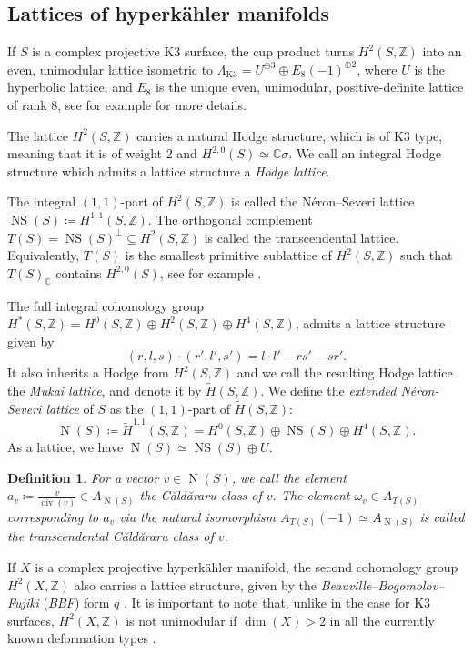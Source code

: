 \documentclass[11pt,twoside]{amsart}
\numberwithin{equation}{section}
\newtheorem{definition}[dummy]{Definition}
\theoremstyle{definition}
\theoremstyle{plain}
\newcommand{\Z}{\ensuremath{\mathbb{Z}}}
\newcommand{\CC}{\ensuremath{\mathbb{C}}}
\def\NS{\operatorname{NS}}
\def\N{\operatorname{N}}
\def\dv{\operatorname{div}}
\begin{document}
\subsection{Lattices of hyperk\"ahler manifolds}
If $S$ is a complex projective K3 surface, the cup product turns $H^2(S,\Z)$ into an even, unimodular lattice isometric to $\Lambda_{\text{K3}} = U^{\oplus 3}\oplus E_{8}(-1)^{\oplus2}$, where $U$ is the hyperbolic lattice, and $E_8$ is the unique even, unimodular, positive-definite lattice of rank 8, see for example \cite[\S VIII.1]{BPV12} for more details.

The lattice $H^2(S,\Z)$ carries a natural Hodge structure, which is of K3 type, meaning that it is of weight 2 and $H^{2,0}(S) \simeq \CC\sigma$. We call an integral Hodge structure which admits a lattice structure a \textit{Hodge lattice}.

The integral $(1,1)$-part of $H^2(S,\Z)$ is called the N\'eron--Severi lattice $\NS(S)\coloneqq H^{1,1}(S,\Z)$.
The orthogonal complement $T(S) = \operatorname{NS}(S)^\perp \subseteq H^2(S,\Z)$ is called the transcendental lattice. Equivalently, $T(S)$ is the smallest primitive sublattice of $H^2(S,\Z)$ such that $T(S)_\CC$ contains $H^{2,0}(S)$, see for example \cite[\S3.2.2]{Huy16}.

The full integral cohomology group $H^*(S,\Z) = H^0(S,\Z)\oplus H^2(S,\Z)\oplus H^4(S,\Z)$, admits a lattice structure given by $$(r,l,s)\cdot(r',l',s') = l\cdot l'-rs'-sr'.$$ It also inherits a Hodge from $H^2(S,\Z)$ and we call the resulting Hodge lattice the \textit{Mukai lattice}, and denote it by $\tilde{H}(S,\Z)$. We define the \textit{extended N\'eron-Severi lattice} of $S$ as the $(1,1)$-part of $\tilde{H}(S,\Z)$: $$\N(S)\coloneqq \tilde{H}^{1,1}(S,\Z) = H^0(S,\Z)\oplus \NS(S)\oplus H^4(S,\Z).$$ As a lattice, we have  $\N(S)\simeq \NS(S)\oplus U.$

\begin{definition}\cite{MS24}\label{def:caldararuclass}
For a vector $v\in \N(S)$, we call the element $a_v\coloneqq \frac{v}{\dv(v)}\in A_{\N(S)}$ the \textit{C\u ald\u araru class of $v$.} The element $\omega_v\in A_{T(S)}$ corresponding to $a_v$ via the natural isomorphism $A_{T(S)}(-1)\simeq A_{\N(S)}$ is called the \textit{transcendental C\u ald\u araru class of $v$.}
\end{definition}

If $X$ is a complex projective hyperk\"ahler manifold, the second cohomology group $H^2(X,\Z)$ also carries a lattice structure, given by the \textit{Beauville--Bogomolov--Fujiki} (\textit{BBF}) form $q$ \cite{Bea83,Bog96,Fuj87}. It is important to note that, unlike in the case for K3 surfaces, $H^2(X,\Z)$ is not unimodular if $\operatorname{dim}(X)>2$ in all the currently known deformation types \cite{Rap08}. 
\end{document}
